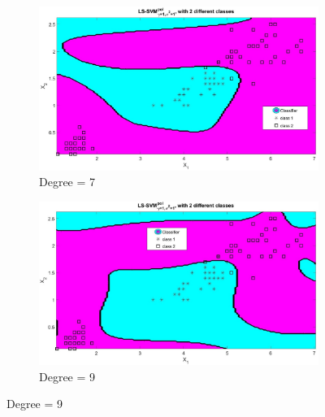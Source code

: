 {\begin{figure}[!htbp]
\begin{subfigure}{.33\textwidth}
 	\end{subfigure}
 	\begin{subfigure}{.33\textwidth}
 		\centering
 		\includegraphics[height=0.8\linewidth,width=1\linewidth]{Exercise1/Report/Ex1.3_deg(7).jpg}
 		\caption{Degree = 7}
 		\label{fig:deg(7)}
 	\end{subfigure}%
 	\begin{subfigure}{.33\textwidth}
 		\centering
 		\includegraphics[height=0.8\linewidth,width=1\linewidth]{Exercise1/Report/Ex1.3_deg(9).jpg}
 		\caption{Degree = 9}
 		\label{fig:deg(9)}
 	\end{subfigure}%

\end{figure}}
